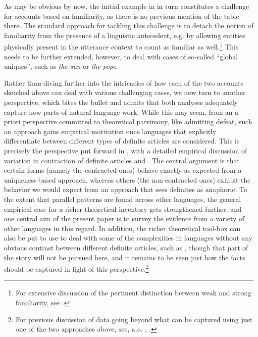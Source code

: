 \documentclass[output=paper
,modfonts
,nonflat]{langscibook}
\begin{document}
As may be obvious by now, the initial example in  in turn
constitutes a challenge for accounts based on familiarity, as there is
no previous mention of the table there. The standard approach for
tackling this challenge is to detach the notion of familiarity from
the presence of a linguistic antecedent, e.g. by allowing entities
physically present in the utterance context to count as familiar as
well.\footnote{For extensive discussion of the pertinent distinction
between weak and strong familiarity, see \citet{Roberts2003}.} This needs to be further extended, however, to deal with
cases of so-called ``global uniques'', such as \textit{the sun} or
\textit{the pope}. 

Rather than diving further into the intricacies of how each of the two
accounts sketched above can deal with various challenging cases, we
now turn to another perspective, which bites the bullet and admits
that both analyses adequately capture how parts of natural language
work. While this may seem, from an a priori
perspective committed to theoretical parsimony, like admitting defeat,
such an approach gains empirical motivation once languages that
explicitly differentiate between different types of definite articles
are considered. This is precisely the perspective put forward in
\citet{Schwarz2009}, with a detailed empirical discussion of variation
in contraction of definite articles and . The central
argument is that certain forms (namely the contracted ones) behave
exactly as expected from a uniqueness-based approach, whereas others
(the non-contracted ones) exhibit the behavior we would expect from an
approach that sees definites as anaphoric. To the extent that parallel
patterns are found across other languages, the general empirical case
for a richer theoretical inventory gets strengthened further, and one
central aim of the present paper is to survey the evidence from a
variety of other languages in this regard. In addition, the richer
theoretical tool-box can also be put to use to deal with some of the
complexities in languages without any obvious contrast between different
definite articles, such as , though that part of the story will
not be pursued here, and it remains to be seen just how the 
facts should be captured in light of this perspective.\footnote{For
previous discussion of  data going beyond what can be captured
using just one of the two
approaches above, see, a.o. \citet{BirnerWard1994}, \citet{PoesioViera1998}.}
\end{document}
